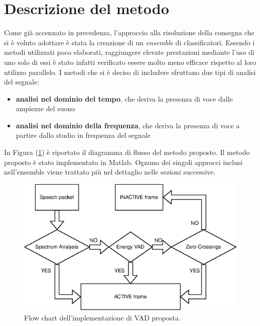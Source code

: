 \documentclass[10pt,twocolumn]{article}
\begin{document}
{\section{Descrizione del metodo}
Come già accennato in precedenza, l'approccio alla risoluzione della consegna che si è voluto adottare è stata
la creazione di un \textit{ensemble} di classificatori. Essendo i metodi utilizzati poco elaborati, raggiungere
elevate prestazioni mediante l'uso di uno solo di essi è stato infatti verificato essere molto meno efficace 
rispetto al loro utilizzo parallelo. I metodi che si è deciso di includere sfruttano due tipi di analisi del segnale:
\begin{itemize}
\item \textbf{analisi nel dominio del tempo}, che deriva la presenza di voce dalle ampiezze del suono
\item \textbf{analisi nel dominio della frequenza}, che deriva la presenza di voce a partire dallo studio in frequenza del segnale
\end{itemize}
In Figura (\ref{fig:diag}) è riportato il diagramma di flusso del metodo proposto. Il metodo proposto è stato implementato in Matlab. Ognuno dei singoli approcci inclusi nell'ensemble viene trattato più nel dettaglio nelle sezioni successive. 

\begin{figure}[h!]
	\centering
	\includegraphics[scale=0.65]{images/diagram.eps}
  	\caption{Flow chart dell'implementazione di VAD proposta.}
  	\label{fig:diag}
\end{figure}

}
\end{document}
